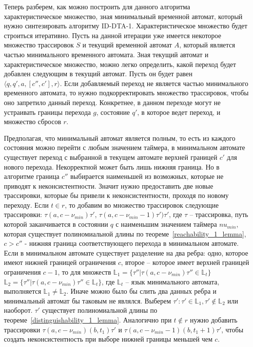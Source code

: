 \documentclass[times,specification,annotation]{itmo-student-thesis}
\begin{document}
Теперь разберем, как можно построить для данного алгоритма характеристическое множество, зная минимальный временной автомат, который нужно синтезировать алгоритму ID-DTA-1. Характеристическое
множество будет строиться итеративно. Пусть на данной итерации уже имеется некоторое множество трассировок $S$ и текущий временной автомат $A$, который является частью минимального временного
автомата. Зная текущий автомат и характеристическое множество, можно легко определить, какой переход будет добавлен следующим в текущий автомат. 
Пусть он будет равен $\langle q, q', a, \left[ c'', c' \right], r \rangle$.  Если добавляемый переход не является частью минимального временного автомата, 
то нужно подкорректировать множество трассировок, чтобы оно запретило данный переход. 
Конкретнее, в данном переходе могут не устраивать границы перехода $g$, состояние $q'$, в которое ведет переход, и множество сбросов $r$.

Предполагая, что минимальный автомат является полным, то есть из каждого состояния можно перейти с любым значением таймера, в минимальном автомате существует переход с выбранной в текущем
автомате верхней границей $c'$ для нового перехода. Некорректной может быть лишь нижняя граница. Но в алгоритме граница $c''$ выбирается наименьшей из возможных, которые не приводят к неконсистентности.
Значит нужно предоставить две новые трассировки, которые бы привели к неконсистентности, проходя по новому переходу. Если $t \in r$, то добавим во множество трассировок
следующие трассировки: $\tau(a, c - \nu_{min})\tau'$, $\tau(a, c - \nu_{min} - 1)\tau')\tau'$, где $\tau$ -- трассировка, путь которой заканчивается в состоянии $q$ с наименьшим значением таймера 
$nu_{min}$, которая существует полиномиальной длины по теореме~\ref{reachability_1_lemma}, $c > c''$ - нижняя граница соответствующего перехода в минимальном автомате. 
Если в минимальном автомате существует разделение на два ребра: одно, которое имеют нижней границей 
ограничения $c$, второе -- которое имеет верхней границей ограничения $c - 1$, то для множеств $\mathbb{L}_1 = \{\tau'' | \tau(a, c - \nu_{min})\tau'' \in \mathbb{L}_t \}$
$\mathbb{L}_2 = \{\tau'' | \tau(a, c - \nu_{min})\tau'' \in \mathbb{L}_t \}$, где $\mathbb{L}_t$ -- язык минимального автомата, выполняется $\mathbb{L}_1 \neq \mathbb{L}_2$. 
Иначе можно было бы слить два данных ребра и минимальный автомат бы таковым не являлся. Выберем $\tau': \tau' \in \mathbb{L}_1, \tau' \not\in \mathbb{L}_2$ или наоборот. 
$\tau'$ существует полиномиальной длины по теореме~\ref{distinguishability_1_lemma}. Аналогично при $t \not\in r$ нужно добавить трассировки $\tau(a, c - \nu_{min})(b, t_1)\tau'$ и
$\tau(a, c - \nu_{min} - 1)(b, t_1 + 1)\tau'$, чтобы создать неконсистентность при выборе нижней границы меньшей чем $c$.
\end{document}
